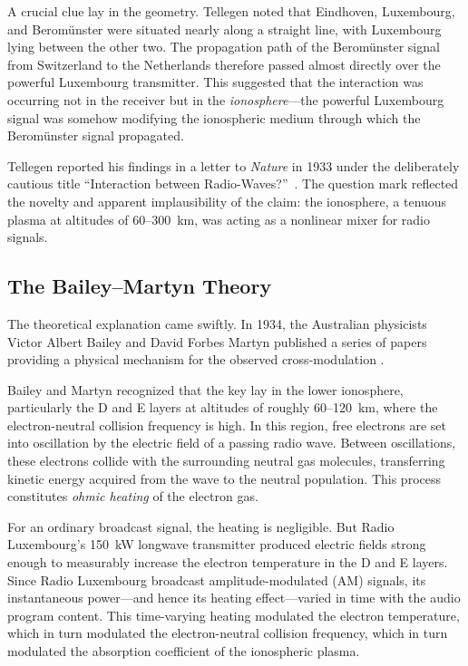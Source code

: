 \documentclass[12pt]{article}
\begin{document}
A crucial clue lay in the geometry.  Tellegen noted that Eindhoven, Luxembourg, and
Berom\"unster were situated nearly along a straight line, with Luxembourg lying between the
other two.  The propagation path of the Berom\"unster signal from Switzerland to the
Netherlands therefore passed almost directly over the powerful Luxembourg transmitter.
This suggested that the interaction was occurring not in the receiver but in the
\emph{ionosphere}---the powerful Luxembourg signal was somehow modifying the ionospheric
medium through which the Berom\"unster signal propagated.

Tellegen reported his findings in a letter to \emph{Nature} in 1933 under the deliberately
cautious title ``Interaction between Radio-Waves?''\ \cite{tellegen1933}.  The question
mark reflected the novelty and apparent implausibility of the claim: the ionosphere, a
tenuous plasma at altitudes of 60--300~km, was acting as a nonlinear mixer for radio
signals.

\subsection{The Bailey--Martyn Theory}

The theoretical explanation came swiftly.  In 1934, the Australian physicists Victor
Albert Bailey and David Forbes Martyn published a series of papers providing a physical
mechanism for the observed cross-modulation
\cite{bailey1934nature,bailey1934philmag,bailey1935}.

Bailey and Martyn recognized that the key lay in the lower ionosphere, particularly the D
and E layers at altitudes of roughly 60--120~km, where the electron-neutral collision
frequency is high.  In this region, free electrons are set into oscillation by the electric
field of a passing radio wave.  Between oscillations, these electrons collide with the
surrounding neutral gas molecules, transferring kinetic energy acquired from the wave to
the neutral population.  This process constitutes \emph{ohmic heating} of the electron
gas.

For an ordinary broadcast signal, the heating is negligible.  But Radio Luxembourg's
150~kW longwave transmitter produced electric fields strong enough to measurably increase
the electron temperature in the D and E layers.  Since Radio Luxembourg broadcast
amplitude-modulated (AM) signals, its instantaneous power---and hence its heating
effect---varied in time with the audio program content.  This time-varying heating
modulated the electron temperature, which in turn modulated the electron-neutral collision
frequency, which in turn modulated the absorption coefficient of the ionospheric plasma.
\end{document}
